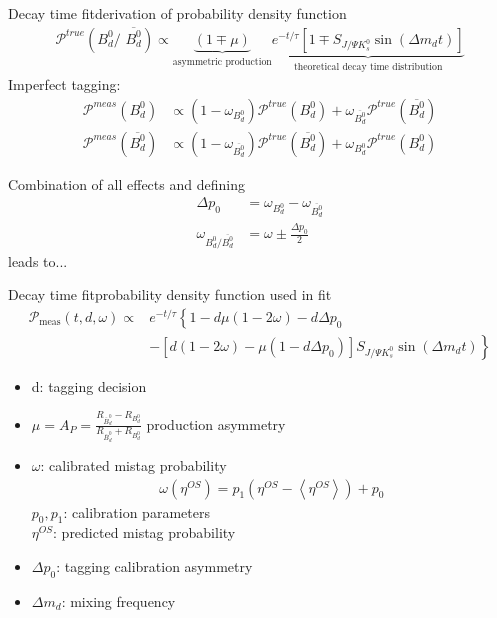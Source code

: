 \documentclass{beamer}
\newcommand{\Bd}{$B_d^0$}
\newcommand{\Bdbar}{$\overline{B_d^0}$}
\newcommand{\SJPsi}{S_{J/\Psi K_s^0}}
\begin{document}
		\begin{frame}{Decay time fit}{derivation of probability density function}
    \begin{align}
    \mathcal{P}^{true}(\text{\Bd / \Bdbar}) \propto \underbrace{(1\mp             \mu)}_{\text{asymmetric production}} \underbrace{e^{-t/\tau}\left[1\mp \SJPsi \sin(\Delta m_d t)\right]}_{\text{theoretical decay time distribution}}
    \end{align}	
    Imperfect tagging: \\
    \begin{align}
    \mathcal{P}^{meas}(\text{\Bd}) &\propto (1-\omega_{\text{\Bd}})\mathcal{P}^{true}(\text{\Bd}) + \omega_{\text{\Bdbar}} \mathcal{P}^{true}(\text{\Bdbar}) \\
 \mathcal{P}^{meas}(\text{\Bdbar}) &\propto (1-\omega_{\text{\Bdbar}})\mathcal{P}^{true}(\text{\Bdbar}) + \omega_{\text{\Bd}} \mathcal{P}^{true}(\text{\Bd})
    \end{align}

    Combination of all effects and defining 
    \begin{align}
    \Delta p_0 &= \omega_{\text{\Bd}}-\omega_{\text{\Bdbar}} \\
    \omega_{\text{\Bd}/\text{\Bdbar}} &= \omega \pm \frac{\Delta p_0}{2}
    \end{align}
	leads to...
	\end{frame}
	
	\begin{frame}{Decay time fit}{probability density function used in fit}
	\begin{align}
\nonumber\mathcal{P}_{\text{meas}}(t, d, \omega) \propto &e^{-t/\tau} \left\lbrace 1-d\mu(1-2\omega)-d\Delta p_0 \right. \\
&- \left.\left[d(1-2\omega)-\mu(1-d\Delta p_0)\right]\SJPsi\sin(\Delta m_d t)\right\rbrace
	\end{align}
	\begin{itemize}
		\item d: tagging decision
		\item $\mu = A_P = \frac{R_{\bar{B}_d^0}-R_{B_d^0}}{R_{\bar{B}_d^0}+R_{B_d^0}}$ production asymmetry
		\item $\omega$: calibrated mistag probability
		      \begin{align}
		      \omega(\eta^{OS}) = p_1 (\eta^{OS} - \left\langle \eta^{OS} \right\rangle) + p_0
		      \end{align}
		      $p_0, p_1$: calibration parameters \\
		      $\eta^{OS}$: predicted mistag probability
		\item $\Delta p_0$: tagging calibration asymmetry
		\item $\Delta m_d$: mixing frequency

	\end{itemize}	
	\end{frame}
	

\end{document}
